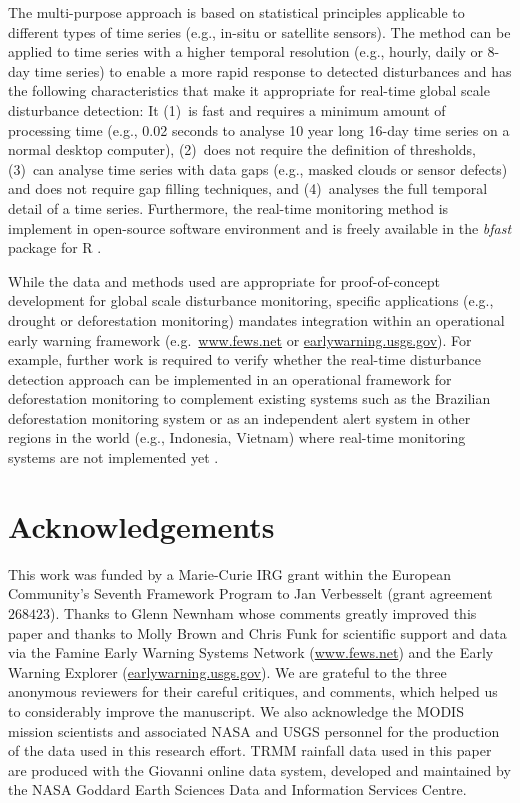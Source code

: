 \documentclass[authoryear,preprint,review,10pt]{elsarticle}
\begin{document}
The multi-purpose approach is based on statistical principles applicable to different types of time series (e.g., in-situ or satellite sensors). The method can be applied to time series with a higher temporal resolution (e.g., hourly, daily or 8-day time series) to enable a more rapid response to detected disturbances and has the following characteristics that make it appropriate for real-time global scale disturbance detection: 
It (1)~is fast and requires a minimum amount of processing time (e.g., 0.02 seconds to analyse 10 year long 16-day time series  on a normal desktop computer),
(2)~does not require the definition of thresholds, (3)~can analyse time series with data gaps (e.g., masked clouds or sensor defects) and does not require gap filling techniques, and (4)~analyses the full temporal detail of a time series. Furthermore, the real-time monitoring method is implement in open-source software environment and is freely available in the \emph{bfast} package for {R} \citep{R}.

While the data and methods used are appropriate for proof-of-concept development for global scale disturbance monitoring, specific applications (e.g., drought or deforestation monitoring) mandates integration within an operational early warning framework (e.g.\ \url{www.fews.net} or \url{earlywarning.usgs.gov}). For example, further work is required to verify whether the real-time disturbance detection approach can be implemented in an operational
framework for deforestation monitoring to complement existing systems such as the Brazilian deforestation monitoring system
\citep{Shimabukuro:2006vb, Souza:2005gl,Asner:2009wa} or as an independent alert system in other regions in the world (e.g., Indonesia, Vietnam)
where real-time monitoring systems are not implemented yet \citep{Asner:2011fa}. 

\section{Acknowledgements}

This work was funded by a Marie-Curie IRG grant within the European Community's Seventh Framework Program to Jan Verbesselt (grant agreement $268423$). Thanks to Glenn Newnham whose comments greatly improved this paper and thanks to Molly Brown and Chris Funk for scientific support and data via the Famine Early Warning Systems Network (\url{www.fews.net}) and the Early Warning Explorer (\url{earlywarning.usgs.gov}). We are grateful to the three anonymous reviewers for their careful critiques, and comments, which helped us to considerably improve the manuscript. We also acknowledge the MODIS mission scientists and associated NASA and USGS personnel for the production of the data used in this research effort. TRMM rainfall data used in this paper are produced with the Giovanni online data system, developed and maintained by the NASA Goddard Earth Sciences Data and Information Services Centre.
\end{document}

